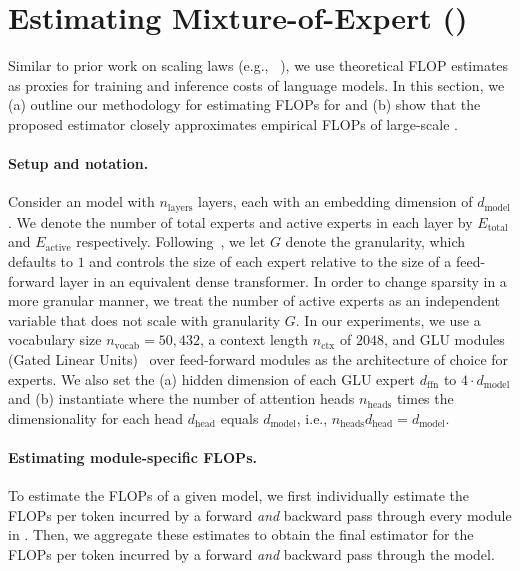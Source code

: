 \section{Estimating Mixture-of-Expert (\moe) \flops}
\label{app:train_inference_cost}

Similar to prior work on scaling laws (e.g., ~\citet{kaplan_scale,hoffmann2022training,ludziejewski2024scaling}), we use theoretical FLOP estimates as proxies for training and inference costs of language models. 
In this section, we (a) outline our methodology for estimating FLOPs for \moes and (b) show that the proposed estimator closely approximates empirical FLOPs of large-scale \moes.

\paragraph{Setup and notation.} 
Consider an \moe model with $n_{\text{layers}}$ \moe layers, each with an embedding dimension of $d_{\text{model}}$. 
We denote the number of total experts and active experts in each \moe layer by $E_{\text{total}}$ and $E_{\text{active}}$ respectively. Following~\citet{ludziejewski2024scaling}, we let $G$ denote the \moe granularity, which defaults to $1$ and controls the size of each expert relative to the size of a feed-forward layer in an equivalent dense transformer. 
In order to change sparsity in a more granular manner, we treat the number of active experts as an independent variable that does not scale with granularity $G$.
In our experiments, we use a vocabulary size $n_{\text{vocab}} = 50,432$, a context length $n_{\text{ctx}}$ of $2048$, and GLU modules (Gated Linear Units)~\citep{shazeer2017} over feed-forward modules as the architecture of choice for \moe experts. 
We also set the (a) hidden dimension of each GLU expert $d_{\text{ffn}}$ to $4 \cdot d_{\text{model}}$ and (b) instantiate \moes where the number of attention heads $n_{\text{heads}}$ times the dimensionality for each head $d_{\text{head}}$ equals $d_{\text{model}}$, i.e., $n_{\text{heads}} d_{\text{head}} = d_{\text{model}}$.

\paragraph{Estimating module-specific FLOPs.} To estimate the FLOPs of a given \moe model, we first individually estimate the FLOPs per token incurred by a forward \emph{and} backward pass through every module in \moes. 
Then, we  aggregate these estimates to obtain the final estimator for the FLOPs per token incurred by a forward \emph{and} backward pass through the model.


